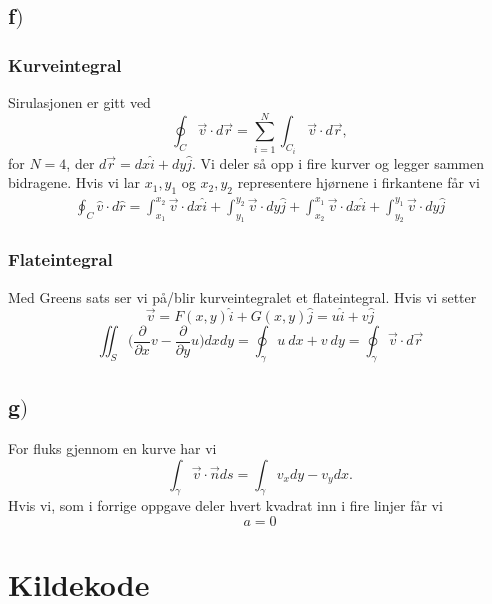\documentclass{article}
\begin{document}
\subsection*{f$)$}
\subsubsection*{Kurveintegral}
Sirulasjonen er gitt ved
\begin{equation}
\oint_C\vec{v}\cdot d\vec{r} = \sum_{i=1}^{N}\int_{C_i}\vec{v}\cdot d\vec{r},
\end{equation}
for $N=4$, der $d\vec{r} = dx\hat{i} + dy\hat{j}$. Vi deler så opp i fire kurver og legger sammen bidragene. Hvis vi lar $x_1, y_1$ og $x_2, y_2$ representere hjørnene i firkantene får vi
\begin{align}
\oint_{C}\hat{v}\cdot d\hat{r} = 
\int_{x_1}^{x_2} \vec{v}\cdot dx\hat{i} +
\int_{y_1}^{y_2} \vec{v}\cdot dy\hat{j} +
\int_{x_2}^{x_1} \vec{v}\cdot dx\hat{i} +
\int_{y_2}^{y_1} \vec{v}\cdot dy\hat{j}
\end{align}

\subsubsection*{Flateintegral}
Med Greens sats ser vi på/blir kurveintegralet et flateintegral. Hvis vi setter
\begin{equation}
\vec{v} = F(x,y)\hat{i} + G(x,y)\hat{j} = u\hat{i} + v\hat{j}
\end{equation}
\begin{equation}
\iint_{S}\bigg( \frac{\partial}{\partial x}v - \frac{\partial}{\partial y}u \bigg)dxdy = \oint_{\gamma}u \ dx + v \ dy = \oint_{\gamma}\vec{v}\cdot d\vec{r}
\end{equation}


\subsection*{g$)$}
For fluks gjennom en kurve har vi
\begin{equation}
\int_{\gamma} \vec{v}\cdot\vec{n}ds = \int_{\gamma}v_{x}dy - v_{y}dx.
\end{equation}
Hvis vi, som i forrige oppgave deler hvert kvadrat inn i fire linjer får vi
\begin{equation}
a = 0
\end{equation}


\section*{Kildekode}
\hypertarget{sourcecode}{}

\end{document}
